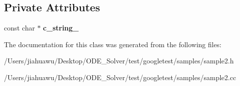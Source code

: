 \subsection*{Private Attributes}
\begin{DoxyCompactItemize}
\item 
\mbox{\label{class_my_string_a1872c0d04ff5f6e654161472b18bb9d0}} 
const char $\ast$ {\bfseries c\+\_\+string\+\_\+}
\end{DoxyCompactItemize}


The documentation for this class was generated from the following files\+:\begin{DoxyCompactItemize}
\item 
/\+Users/jiahuawu/\+Desktop/\+O\+D\+E\+\_\+\+Solver/test/googletest/samples/sample2.\+h\item 
/\+Users/jiahuawu/\+Desktop/\+O\+D\+E\+\_\+\+Solver/test/googletest/samples/sample2.\+cc\end{DoxyCompactItemize}
